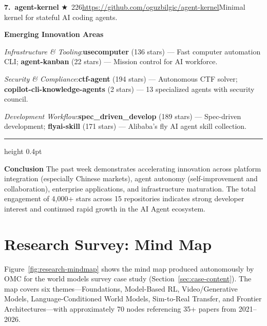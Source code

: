 \begin{mdframed}[
  linewidth=0.8pt,
  linecolor=black!40,
  backgroundcolor=black!2,
  innertopmargin=16pt,
  innerbottommargin=16pt,
  innerleftmargin=18pt,
  innerrightmargin=18pt,
  roundcorner=4pt
]
\noindent\textbf{7.~agent-kernel} $\bigstar$~226\quad \url{https://github.com/oguzbilgic/agent-kernel}\quad Minimal kernel for stateful AI coding agents.

\vspace{8pt}
\noindent\textbf{Emerging Innovation Areas}

\noindent\textit{Infrastructure \& Tooling}:\quad \textbf{usecomputer} (136 stars) --- Fast computer automation CLI; \textbf{agent-kanban} (22 stars) --- Mission control for AI workforce.

\noindent\textit{Security \& Compliance}:\quad \textbf{ctf-agent} (194 stars) --- Autonomous CTF solver; \textbf{copilot-cli-knowledge-agents} (2 stars) --- 13 specialized agents with security council.

\noindent\textit{Development Workflow}:\quad \textbf{spec\_driven\_develop} (189 stars) --- Spec-driven development; \textbf{flyai-skill} (171 stars) --- Alibaba's fly AI agent skill collection.

\vspace{8pt}
\hrule height 0.4pt
\vspace{8pt}

\noindent\textbf{Conclusion}\quad
The past week demonstrates accelerating innovation across platform integration (especially Chinese markets), agent autonomy (self-improvement and collaboration), enterprise applications, and infrastructure maturation. The total engagement of 4,000+ stars across 15 repositories indicates strong developer interest and continued rapid growth in the AI Agent ecosystem.

\vspace{6pt}

\end{mdframed}


\section{Research Survey: Mind Map}
\label{sec:research-mindmap}

Figure~\ref{fig:research-mindmap} shows the mind map produced autonomously by OMC for the world models survey case study (Section~\ref{sec:case-content}).  The map covers six themes---Foundations, Model-Based RL, Video/Generative Models, Language-Conditioned World Models, Sim-to-Real Transfer, and Frontier Architectures---with approximately 70 nodes referencing 35+ papers from 2021--2026.

